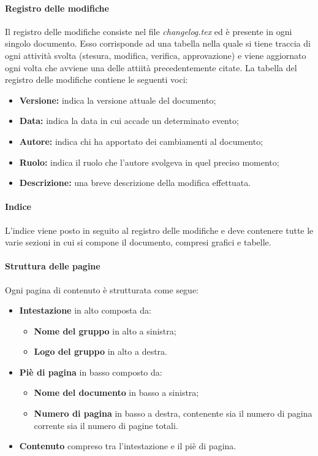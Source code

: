 \paragraph{Registro delle modifiche}
Il registro delle modifiche consiste nel file \textit{changelog.tex} ed è presente in ogni singolo documento.
Esso corrisponde ad una tabella nella quale si tiene traccia di ogni attività svolta (stesura, modifica, verifica, approvazione) e viene aggiornato ogni volta che avviene una delle attiità precedentemente citate.
La tabella del registro delle modifiche contiene le seguenti voci:
\begin{itemize}
    \item \textbf{Versione:} indica la versione attuale del documento;
    \item \textbf{Data:} indica la data in cui accade un determinato evento;
    \item \textbf{Autore:} indica chi ha apportato dei cambiamenti al documento;
    \item \textbf{Ruolo:} indica il ruolo che l'autore svolgeva in quel preciso momento;
    \item \textbf{Descrizione:} una breve descrizione della modifica effettuata.
\end {itemize}
\paragraph{Indice}
L'indice viene posto in seguito al registro delle modifiche e deve contenere tutte le varie sezioni in cui si compone il documento, compresi grafici e tabelle.
\paragraph{Struttura delle pagine}
Ogni pagina di contenuto è strutturata come segue:
\begin {itemize}
    \item \textbf{Intestazione} in alto composta da:
    \begin {itemize}
        \item \textbf{Nome del gruppo} in alto a sinistra;
        \item \textbf{Logo del gruppo} in alto a destra.
    \end{itemize}
    \item \textbf{Piè di pagina} in basso composto da:
    \begin{itemize}
        \item \textbf{Nome del documento} in basso a sinistra;
        \item \textbf{Numero di pagina} in basso a destra, contenente sia il numero di pagina corrente sia il numero di pagine totali.
    \end {itemize}
    \item \textbf{Contenuto} compreso tra l'intestazione e il piè di pagina.
\end {itemize}

